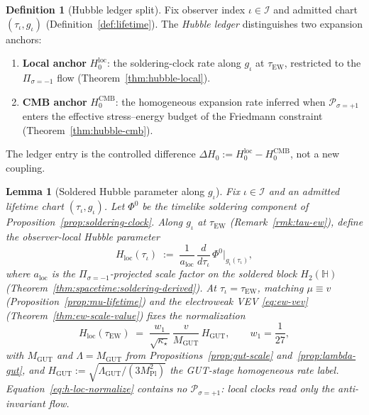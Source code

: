 \documentclass[11pt]{article}
\theoremstyle{plain}
\newtheorem{lemma}[theorem]{Lemma}
\theoremstyle{definition}
\newtheorem{definition}[theorem]{Definition}
\theoremstyle{remark}
\numberwithin{equation}{section}
\newcommand{\Quat}{\mathbb{H}}
\newcommand{\orderparam}{\Phi}
\newcommand{\MPl}{M_{\mathrm{Pl}}}
\begin{document}
\begin{definition}[Hubble ledger split]
\label{def:hubble-ledger}
Fix observer index $\iota\in\mathcal{I}$ and admitted chart
$(\tau_\iota,g_\iota)$ (Definition~\ref{def:lifetime}). The \emph{Hubble
ledger} distinguishes two expansion anchors:
\begin{enumerate}[label=(\roman*),leftmargin=*]
  \item \textbf{Local anchor} $H_0^{\mathrm{loc}}$: the soldering-clock rate
    along $g_\iota$ at $\tau_{\mathrm{EW}}$, restricted to the
    $\Pi_{\sigma=-1}$ flow (Theorem~\ref{thm:hubble-local}).
  \item \textbf{CMB anchor} $H_0^{\mathrm{CMB}}$: the homogeneous expansion
    rate inferred when $\mathcal{P}_{\sigma=+1}$ enters the effective
    stress--energy budget of the Friedmann constraint
    (Theorem~\ref{thm:hubble-cmb}).
\end{enumerate}
The ledger entry is the controlled difference
$\Delta H_0:=H_0^{\mathrm{loc}}-H_0^{\mathrm{CMB}}$, not a new coupling.
\end{definition}

\begin{lemma}[Soldered Hubble parameter along $g_\iota$]
\label{lem:soldered-hubble}
Fix $\iota\in\mathcal{I}$ and an admitted lifetime chart
$(\tau_\iota,g_\iota)$. Let $\orderparam^0$ be the timelike soldering component
of Proposition~\ref{prop:soldering-clock}. Along $g_\iota$ at
$\tau_{\mathrm{EW}}$ (Remark~\ref{rmk:tau-ew}), define the
\emph{observer-local Hubble parameter}
\begin{equation}\label{eq:h-soldered}
  H_{\mathrm{loc}}(\tau_\iota)
  \;:=\;
  \frac{1}{a_{\mathrm{loc}}}\,
  \frac{d}{d\tau_\iota}\,
  \orderparam^0\big|_{g_\iota(\tau_\iota)},
\end{equation}
where $a_{\mathrm{loc}}$ is the $\Pi_{\sigma=-1}$-projected scale factor on
the soldered block $H_2(\Quat)$ (Theorem~\ref{thm:spacetime:soldering-derived}).
At $\tau_\iota=\tau_{\mathrm{EW}}$, matching $\mu\equiv v$
(Proposition~\ref{prop:mu-lifetime}) and the electroweak VEV
\eqref{eq:ew-vev} (Theorem~\ref{thm:ew-scale-value}) fixes the normalization
\begin{equation}\label{eq:h-loc-normalize}
  H_{\mathrm{loc}}(\tau_{\mathrm{EW}})
  \;=\;
  \frac{w_1}{\sqrt{\kappa_\star}}\,
  \frac{v}{M_{\mathrm{GUT}}}\,
  H_{\mathrm{GUT}},
  \qquad
  w_1=\frac{1}{27},
\end{equation}
with $M_{\mathrm{GUT}}$ and $\Lambda=M_{\mathrm{GUT}}$ from
Propositions~\ref{prop:gut-scale} and~\ref{prop:lambda-gut}, and
$H_{\mathrm{GUT}}:=\sqrt{\Lambda_{\mathrm{GUT}}/(3\MPl^2)}$ the GUT-stage
homogeneous rate label. Equation~\eqref{eq:h-loc-normalize} contains no
$\mathcal{P}_{\sigma=+1}$: local clocks read only the anti-invariant flow.
\end{lemma}
\end{document}
